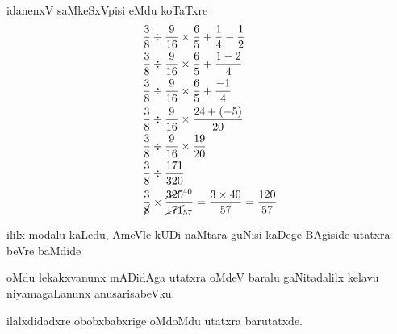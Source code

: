 idanenxV saMkeSxVpisi eMdu koTaTxre
\begin{align*}
& \dfrac{3}{8}\div \dfrac{9}{16}\times\dfrac{6}{5}+\dfrac{1}{4}-\dfrac{1}{2}\\
& \dfrac{3}{8}\div \dfrac{9}{16}\times\dfrac{6}{5}+\dfrac{1-2}{4}\\
& \dfrac{3}{8}\div \dfrac{9}{16}\times \dfrac{6}{5}+\dfrac{-1}{4}\\
& \dfrac{3}{8}\div \dfrac{9}{16}\times \dfrac{24+(-5)}{20}\\
& \dfrac{3}{8}\div \dfrac{9}{16}\times \dfrac{19}{20}\\
& \dfrac{3}{8}\div \dfrac{171}{320}\\
& \dfrac{3}{\cancel{8}}\times \dfrac{\cancel{320}^{40}}{\cancel{171}_{57}}=\dfrac{3\times 40}{57}=\dfrac{120}{57}
\end{align*}

ililx modalu kaLedu, AmeVle kUDi naMtara guNisi kaDege BAgiside utatxra beVre baMdide

oMdu lekakxvanunx mADidAga utatxra oMdeV baralu gaNitadalilx kelavu niyamagaLanunx anusarisabeVku.

ilalxdidadxre obobxbabxrige oMdoMdu utatxra barutatxde.


